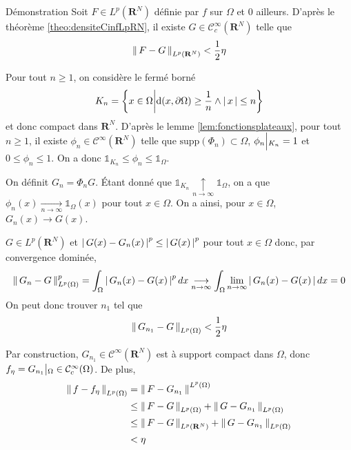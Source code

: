         \begin{demo}{Démonstration}
            Soit $F \in L^p(\mathbf{R}^N)$ définie par $f$ sur $\Omega$ et $0$ ailleurs. D’après le théorème \ref{theo:densiteCinfLpRN}, il existe $G \in \mathcal{C}^{\infty}_c(\mathbf{R}^N)$ telle que 
            \[ \left\lVert \, F - G \, \right\rVert_{L^p(\mathbf{R}^N)} < \frac{1}{2} \eta \]   
            
            Pour tout $n \geq 1$, on considère le fermé borné 
            \[ K_n = \left\{x \in \Omega \middle| \text{d}(x,\partial\Omega) \geq \frac{1}{n} \land \left\lvert \, x \, \right\rvert \leq n \right\} \]   
            et donc compact dans $\mathbf{R}^N$. D’après le lemme \ref{lem:fonctionsplateaux}, pour tout $n \geq 1$, il existe $\phi_n \in \mathcal{C}^{\infty}(\mathbf{R}^N)$ telle que $\text{supp}(\Phi_n) \subset \Omega$, $\phi_n \Big|\vphantom{\big|}_{K_n} = 1$ et $0 \leq \phi_n \leq 1$.  On a donc $\mathbb{1}_{K_n} \leq \phi_n \leq \mathbb{1}_{\Omega}$. 

            On définit $G_n = \Phi_n G$. Étant donné que $\mathbb{1}_{K_n} \underset{n \to \infty}{\uparrow} \mathbb{1}_{\Omega}$, on a que $\phi_n(x) \underset{n \to \infty}{\longrightarrow} \mathbb{1}_{\Omega}(x)$ pour tout $x \in \Omega$. On a ainsi, pour $x \in \Omega$, $G_n(x) \to G(x)$.

            $G \in L^p(\mathbf{R}^N)$ et $\left\lvert \, G(x) - G_n(x) \, \right\rvert^p \leq \left\lvert \, G(x) \, \right\rvert^p$ pour tout $x \in \Omega$ donc, par convergence dominée, 
            \[ \left\lVert \, G_n - G \, \right\rVert_{L^p(\Omega)}^p = \int_{\Omega} \left\lvert \, G_n(x) - G(x) \, \right\rvert^p dx \underset{n \to \infty}{\longrightarrow} \int_{\Omega} \lim_{n \to \infty} \left\lvert \, G_n(x) - G(x) \, \right\rvert dx = 0 \]   
            On peut donc trouver $n_1$ tel que 
            \[ \left\lVert \, G_{n_1} - G \, \right\rVert_{L^p(\Omega)} < \frac{1}{2}\eta \]

            Par construction, $G_{n_1} \in \mathcal{C}^{\infty}(\mathbf{R}^N)$ est à support compact dans $\Omega$, donc $f_{\eta} =  G_{n_1} \big|\vphantom{|}_{\Omega} \in \mathcal{C}_c^{\infty}(\Omega)$. De plus, 
            \begin{align*}
                \left\lVert \, f - f_{\eta} \, \right\rVert_{L^p(\Omega)} 
                &= \left\lVert \, F - G_{n_1} \, \right\rVert^{L^p(\Omega)} \\
                &\leq \left\lVert \, F - G \, \right\rVert_{L^p(\Omega)} + \left\lVert \, G - G_{n_1} \, \right\rVert_{L^p(\Omega)} \\
                &\leq \left\lVert \, F - G \, \right\rVert_{L^p(\mathbf{R}^N)} + \left\lVert \, G - G_{n_1} \, \right\rVert_{L^p(\Omega)} \\
                &< \eta
            \end{align*} 
        \end{demo}



